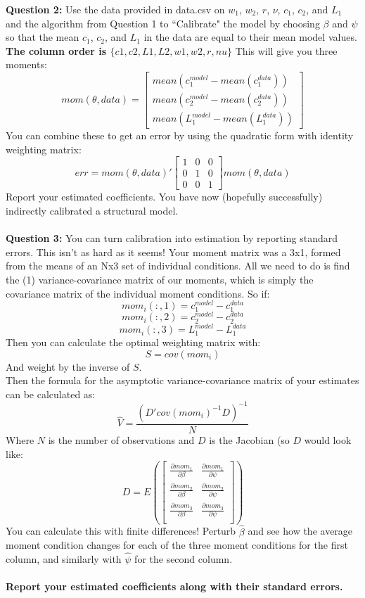 \documentclass[11pt]{article}
\begin{document}
\textbf{Question 2:}  Use the data provided in data.csv on $w_1$, $w_2$, $r$, $\nu$, $c_1$, $c_2$, and $L_1$ and the algorithm from Question 1 to ``Calibrate" the model by choosing $\beta$ and $\psi$ so that the mean $c_1$, $c_2$, and $L_1$ in the data are equal to their mean model values.  \textbf{The column order is $\{c1,c2,L1,L2,w1,w2,r,nu\}$ }This will give you three moments:
$$mom(\theta,data)=\left[\begin{array}{c}mean(c_1^{model}-mean(c_1^{data})) \\ mean(c_2^{model}-mean(c_2^{data})) \\ mean(L_1^{model}-mean(L_1^{data}))\end{array}\right]$$
You can combine these to get an error by using the quadratic form with identity weighting matrix:
$$err=mom(\theta,data)'\left[\begin{array}{ccc}1 & 0 & 0 \\ 0 & 1 & 0 \\ 0 & 0 & 1\end{array}\right]mom(\theta,data)$$
Report your estimated coefficients.  You have now (hopefully successfully) indirectly calibrated a structural model. \\
\ \\
\textbf{Question 3:}  You can turn calibration into estimation by reporting standard errors. This isn't as hard as it seems! Your moment matrix was a 3x1, formed from the means of an Nx3 set of individual conditions. All we need to do is find the (1) variance-covariance matrix of our moments, which is simply the covariance matrix of the individual moment conditions.  So if:
$$mom_i(:,1) = c_1^{model}-c_1^{data}$$
$$mom_i(:,2) = c_2^{model}-c_2^{data}$$
$$mom_i(:,3) = L_1^{model}-L_1^{data}$$
Then you can calculate the optimal weighting matrix with:
$$S=cov(mom_i)$$
And weight by the inverse of $S$.  \\
Then the formula for the asymptotic variance-covariance matrix of your estimates can be calculated as:
$$\hat{V}=\frac{\left(D'cov(mom_i)^{-1}D\right)^{-1}}{N}$$
Where $N$ is the number of observations and $D$ is the Jacobian (so $D$ would look like:
$$D=E\left(\left[\begin{array}{ccc}\frac{\partial mom_1}{\partial \beta} & \frac{\partial mom_1}{\partial \psi} \\ \frac{\partial mom_2}{\partial \beta} & \frac{\partial mom_2}{\partial \psi} \\ \frac{\partial mom_3}{\partial \beta} & \frac{\partial mom_3}{\partial \psi} \\\end{array}\right]\right)$$
You can calculate this with finite differences!  Perturb $\hat{\beta}$ and see how the average moment condition changes for each of the three moment conditions for the first column, and similarly with $\hat{\psi}$ for the second column.
\ \\
\ \\
\textbf{Report your estimated coefficients along with their standard errors.}
 \\
\ \\
\end{document}
